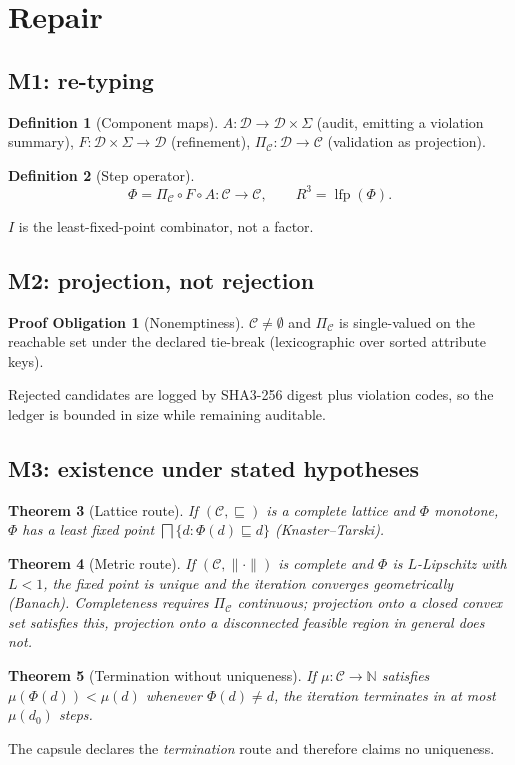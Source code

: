 \documentclass[11pt,a4paper]{article}
\theoremstyle{plain}
\newtheorem{theorem}{Theorem}[section]
\theoremstyle{definition}
\newtheorem{definition}[theorem]{Definition}
\newtheorem{obligation}{Proof Obligation}
\theoremstyle{remark}
\DeclareMathOperator{\lfp}{lfp}
\newcommand{\Rc}{R^{3}}
\newcommand{\Cfeas}{\mathcal{C}}
\newcommand{\Proj}{\Pi_{\Cfeas}}
\begin{document}
\section{Repair}
\subsection{M1: re-typing}
\begin{definition}[Component maps]
$A:\mathcal{D}\to\mathcal{D}\times\Sigma$ (audit, emitting a violation summary),
$F:\mathcal{D}\times\Sigma\to\mathcal{D}$ (refinement),
$\Proj:\mathcal{D}\to\Cfeas$ (validation as projection).
\end{definition}
\begin{definition}[Step operator]
\begin{equation}\label{eq:phi}
\Phi=\Proj\circ F\circ A:\Cfeas\to\Cfeas,\qquad \Rc=\lfp(\Phi).
\end{equation}
\end{definition}
$I$ is the least-fixed-point combinator, not a factor.

\subsection{M2: projection, not rejection}
\begin{obligation}[Nonemptiness]
$\Cfeas\neq\emptyset$ and $\Proj$ is single-valued on the reachable set under
the declared tie-break (lexicographic over sorted attribute keys).
\end{obligation}
Rejected candidates are logged by SHA3-256 digest plus violation codes, so the
ledger is bounded in size while remaining auditable.

\subsection{M3: existence under stated hypotheses}
\begin{theorem}[Lattice route]
If $(\Cfeas,\sqsubseteq)$ is a complete lattice and $\Phi$ monotone, $\Phi$ has
a least fixed point $\bigsqcap\{d:\Phi(d)\sqsubseteq d\}$ (Knaster--Tarski).
\end{theorem}
\begin{theorem}[Metric route]
If $(\Cfeas,\lVert\cdot\rVert)$ is complete and $\Phi$ is $L$-Lipschitz with
$L<1$, the fixed point is unique and the iteration converges geometrically
(Banach). Completeness requires $\Proj$ continuous; projection onto a closed
convex set satisfies this, projection onto a disconnected feasible region in
general does not.
\end{theorem}
\begin{theorem}[Termination without uniqueness]\label{thm:term}
If $\mu:\Cfeas\to\mathbb{N}$ satisfies $\mu(\Phi(d))<\mu(d)$ whenever
$\Phi(d)\neq d$, the iteration terminates in at most $\mu(d_0)$ steps.
\end{theorem}
The capsule declares the \emph{termination} route and therefore claims no
uniqueness.
\end{document}

